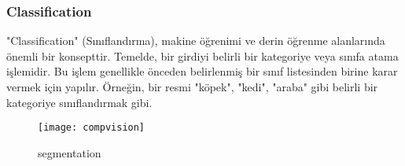 \documentclass[11pt,a4paper]{report}
\begin{document}
\begin{justify}
   	\subsubsection{Classification}
   	
   	"Classification" (Sınıflandırma), makine öğrenimi ve derin öğrenme alanlarında önemli bir konsepttir. Temelde, bir girdiyi belirli bir kategoriye veya sınıfa atama işlemidir. Bu işlem genellikle önceden belirlenmiş bir sınıf listesinden birine karar vermek için yapılır. Örneğin, bir resmi "köpek", "kedi", "araba" gibi belirli bir kategoriye sınıflandırmak gibi.\cite{Segmentasyon}
   	
   	\begin{figure}[!h]
   		\centering
   		\texttt{[image: compvision]}
   		\caption{segmentation}
   		\label{fig:ornek7}
   	\end{figure}
   \end{justify}
   
\end{document}
